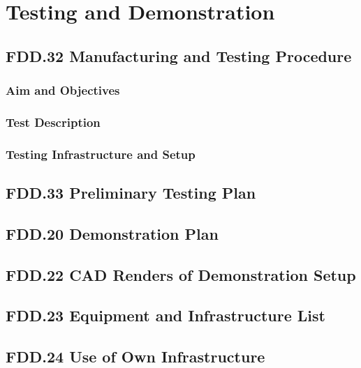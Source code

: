 \chapter{Testing and Demonstration}

\section{FDD.32 Manufacturing and Testing Procedure}
\subsection{Aim and Objectives}
\subsection{Test Description}
\subsection{Testing Infrastructure and Setup}

\section{FDD.33 Preliminary Testing Plan}

\section{FDD.20 Demonstration Plan}

\section{FDD.22 CAD Renders of Demonstration Setup}

\section{FDD.23 Equipment and Infrastructure List}

\section{FDD.24 Use of Own Infrastructure}
